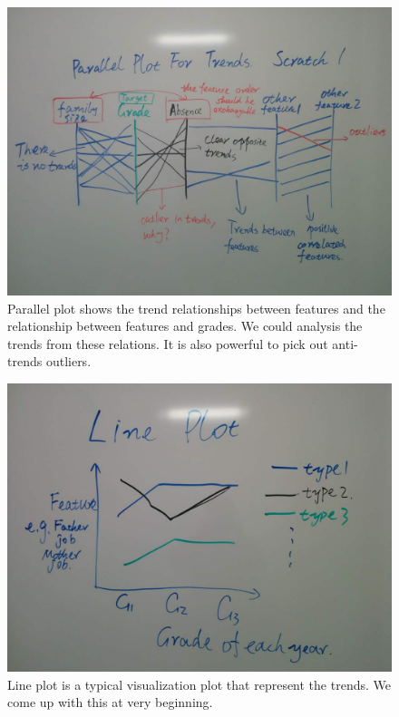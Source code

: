 \documentclass{article}
\begin{document}
\begin{figure}[H]
\centering
\includegraphics[scale=0.25]{parallel_plot.jpg}
\caption{Parallel plot shows the trend relationships between features and the relationship between features and grades. We could analysis the trends from these relations. It is also powerful to pick out anti-trends outliers.}
\end{figure}

\begin{figure}[H]
\centering
\includegraphics[scale=0.25]{line_plot.jpg}
\caption{Line plot is a typical visualization plot that represent the trends. We come up with this at very beginning.}
\end{figure}
\end{document}
